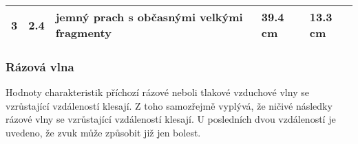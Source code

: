\documentclass[
]{article}
\begin{document}
\begin{longtable}[]{@{}lllll@{}}
\begin{minipage}[t]{0.02\columnwidth}
3\strut
\end{minipage} & \begin{minipage}[t]{0.17\columnwidth}\raggedright
2.4\strut
\end{minipage} & \begin{minipage}[t]{0.31\columnwidth}\raggedright
jemný prach s občasnými velkými fragmenty\strut
\end{minipage} & \begin{minipage}[t]{0.18\columnwidth}\raggedright
39.4 cm\strut
\end{minipage} & \begin{minipage}[t]{0.17\columnwidth}\raggedright
13.3 cm\strut
\end{minipage}\tabularnewline
\bottomrule
\end{longtable}

\hypertarget{ruxe1zovuxe1-vlna}{%
\subsubsection{Rázová vlna}\label{ruxe1zovuxe1-vlna}}

Hodnoty charakteristik příchozí rázové neboli tlakové vzduchové vlny se
vzrůstající vzdáleností klesají. Z toho samozřejmě vyplývá, že ničivé
následky rázové vlny se vzrůstající vzdáleností klesají. U posledních
dvou vzdáleností je uvedeno, že zvuk může způsobit již jen bolest.
\end{document}

